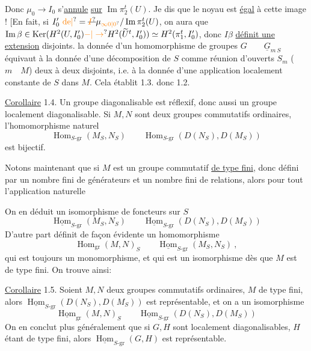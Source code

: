 Donc  $\mu_0\to I_0$ s'\uline{annule} \uline{sur} $\operatorname{Im}\pi_2^t(U)$. Je dis que  le noyau
est \uline{égal} à cette image ! [En fait, si $I'_0\ \unsure{\mathrm{de}|{}}=\deleted{\unsure{I}}\mu_{\unsure{\infty0|0}}/\operatorname{Im}\pi_2^t(U)$, on aura que $\operatorname{Im}\beta\in\operatorname{Ker}(H^2(U,I'_0)\unsure{-|\to}H^2(\widetilde U^t,I'_0))\simeq H^2(\pi_1^t,I'_0)$, donc $I\beta$ \uline{définit une extension}
disjoints.  la donnée d'un homomorphisme de groupes $G\qquad\underline G_{m\ S}$ équivaut à la donnée d'une décomposition de $S$ comme réunion d'ouverts $S_m$ ($m\quad M$) deux à deux disjoints, i.e. à la donnée d'une application localement constante de $S$ dans $M$. Cela établit 1.3. donc 1.2.

\uline{Corollaire} 1.4. Un groupe diagonalisable est réflexif, donc aussi un groupe localement diagonalisable. Si $M,N$ sont deux groupes commutatifs ordinaires,  l'homomorphisme naturel
\[
 \operatorname{Hom}_{S\text{-gr}}(M_S,N_S)\qquad\operatorname{Hom}_{S\text{-gr}}(D(N_S),D(M_S))
\]
est bijectif.

Notons maintenant que si $M$ est un groupe commutatif \uline{de type fini},  donc défini par un nombre fini de générateurs et un nombre fini de relations, alors pour tout   l'application naturelle

On en déduit un isomorphisme de foncteurs sur $S$\unsure{:|=}
\[
 \underline{\operatorname{Hom}}_{S\text{-gr}}(M_S,N_S)\qquad\underline{\operatorname{Hom}}_{S\text{-gr}}(D(N_S),D(M_S))
\]
D'autre part  définit de façon évidente un homomorphisme
\[
 \operatorname{Hom}_{\mathrm{gr}}(M,N)_S\qquad\underline{\operatorname{Hom}}_{S\text{-gr}}(M_S,N_S)\ ,
\]
qui est toujours  un monomorphisme, et qui est un isomorphisme dès que $M$ est de type fini. On trouve ainsi:

\uline{Corollaire} 1.5.  Soient $M,N$ deux groupes commutatifs ordinaires, $M$ de type fini, alors  $\underline{\operatorname{Hom}}_{S\text{-gr}}(D(N_S),D(M_S))$ est représentable, et on a un isomorphisme
\[
 \underline{\operatorname{Hom}}_{\mathrm{gr}}(M,N)_S\qquad\underline{\operatorname{Hom}}_{S\text{-gr}}(D(N_S),D(M_S))
\]
On en conclut plus généralement que si $G,H$ sont localement diagonalisables, $H$ étant de type fini, alors $\underline{\operatorname{Hom}}_{S\text{-gr}}(G,H)$ est représentable.

